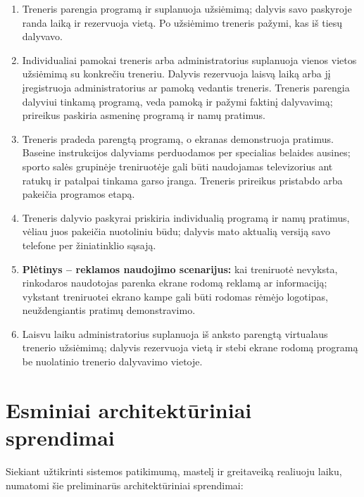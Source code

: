 \documentclass[a4paper,11pt]{article}
\begin{document}
\begin{enumerate}
    \item Treneris parengia programą ir suplanuoja užsiėmimą; dalyvis savo paskyroje randa laiką ir rezervuoja vietą. Po užsiėmimo treneris pažymi, kas iš tiesų dalyvavo.
    \item Individualiai pamokai treneris arba administratorius suplanuoja vienos vietos užsiėmimą su konkrečiu treneriu. Dalyvis rezervuoja laisvą laiką arba jį įregistruoja administratorius ar pamoką vedantis treneris. Treneris parengia dalyviui tinkamą programą, veda pamoką ir pažymi faktinį dalyvavimą; prireikus paskiria asmeninę programą ir namų pratimus.
    \item Treneris pradeda parengtą programą, o ekranas demonstruoja pratimus. Baseine instrukcijos dalyviams perduodamos per specialias belaides ausines; sporto salės grupinėje treniruotėje gali būti naudojamas televizorius ant ratukų ir patalpai tinkama garso įranga. Treneris prireikus pristabdo arba pakeičia programos etapą.
    \item Treneris dalyvio paskyrai priskiria individualią programą ir namų pratimus, vėliau juos pakeičia nuotoliniu būdu; dalyvis mato aktualią versiją savo telefone per žiniatinklio sąsają.
    \item \textbf{Plėtinys -- reklamos naudojimo scenarijus:} kai treniruotė nevyksta, rinkodaros naudotojas parenka ekrane rodomą reklamą ar informaciją; vykstant treniruotei ekrano kampe gali būti rodomas rėmėjo logotipas, neuždengiantis pratimų demonstravimo.
    \item Laisvu laiku administratorius suplanuoja iš anksto parengtą virtualaus trenerio užsiėmimą; dalyvis rezervuoja vietą ir stebi ekrane rodomą programą be nuolatinio trenerio dalyvavimo vietoje.
\end{enumerate}

\section{Esminiai architektūriniai sprendimai}

Siekiant užtikrinti sistemos patikimumą, mastelį ir greitaveiką realiuoju laiku, numatomi šie preliminarūs architektūriniai sprendimai:
\end{document}
